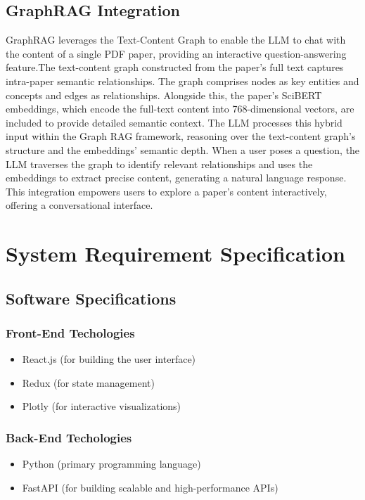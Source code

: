 \documentclass[a4paper,12pt]{article}
\begin{document}
\subsection{GraphRAG Integration}
GraphRAG leverages the Text-Content Graph to enable the LLM to chat with the content
of a single PDF paper, providing an interactive question-answering feature.The
text-content graph constructed from the paper’s full text captures intra-paper
semantic relationships. The graph comprises nodes as key entities and concepts
and edges as relationships. Alongside this, the paper’s SciBERT embeddings, which
encode the full-text content into 768-dimensional vectors, are included to provide
detailed semantic context. The LLM processes this hybrid input within the Graph RAG
framework, reasoning over the text-content graph’s structure and the embeddings’
semantic depth. When a user poses a question, the LLM traverses the graph to identify
relevant relationships and uses the embeddings to extract precise content, generating
a natural language response. This integration empowers users to explore a paper’s
content interactively, offering a conversational interface.
\newpage

\section{System Requirement Specification}
\subsection{Software Specifications}
\subsubsection{Front-End Techologies}
\begin{itemize}
    \item React.js (for building the user interface)
    \vspace{-10pt}
    \item Redux (for state management)
    \vspace{-10pt}
    \item Plotly (for interactive visualizations)
\end{itemize}

\subsubsection{Back-End Techologies}
\begin{itemize}
    \item Python (primary programming language)
    \vspace{-10pt}
    \item FastAPI (for building scalable and high-performance APIs)
\end{itemize}
\newpage
\end{document}
